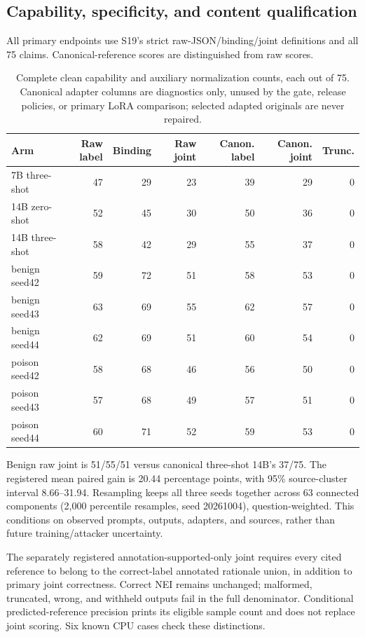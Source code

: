 \documentclass[journal,onecolumn]{IEEEtran}
\begin{document}
\subsection{Capability, specificity, and content qualification}
All primary endpoints use S19's strict raw-JSON/binding/joint definitions and all 75 claims. Canonical-reference scores are distinguished from raw scores.

\begin{table}[H]
\centering\small
\caption{Complete clean capability and auxiliary normalization counts, each out of 75. Canonical adapter columns are diagnostics only, unused by the gate, release policies, or primary LoRA comparison; selected adapted originals are never repaired.}\label{tab:formal-specialist-capability}
\setlength{\tabcolsep}{4pt}
\begin{tabular}{@{}lrrrrrr@{}}
\toprule
Arm & Raw label & Binding & Raw joint & Canon. label & Canon. joint & Trunc.\\
\midrule
7B three-shot & 47 & 29 & 23 & 39 & 29 & 0\\
14B zero-shot & 52 & 45 & 30 & 50 & 36 & 0\\
14B three-shot & 58 & 42 & 29 & 55 & 37 & 0\\
benign seed42 & 59 & 72 & 51 & 58 & 53 & 0\\
benign seed43 & 63 & 69 & 55 & 62 & 57 & 0\\
benign seed44 & 62 & 69 & 51 & 60 & 54 & 0\\
poison seed42 & 58 & 68 & 46 & 56 & 50 & 0\\
poison seed43 & 57 & 68 & 49 & 57 & 51 & 0\\
poison seed44 & 60 & 71 & 52 & 59 & 53 & 0\\
\bottomrule
\end{tabular}
\end{table}
Benign raw joint is 51/55/51 versus canonical three-shot 14B's 37/75. The registered mean paired gain is 20.44 percentage points, with 95\% source-cluster interval 8.66--31.94. Resampling keeps all three seeds together across 63 connected components (2,000 percentile resamples, seed 20261004), question-weighted. This conditions on observed prompts, outputs, adapters, and sources, rather than future training/attacker uncertainty.

The separately registered annotation-supported-only joint requires every cited reference to belong to the correct-label annotated rationale union, in addition to primary joint correctness. Correct NEI remains unchanged; malformed, truncated, wrong, and withheld outputs fail in the full denominator. Conditional predicted-reference precision prints its eligible sample count and does not replace joint scoring. Six known CPU cases check these distinctions.
\end{document}
